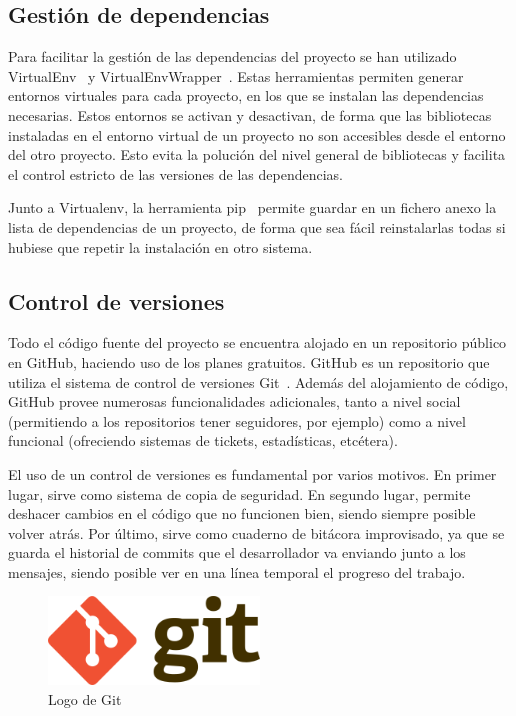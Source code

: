 \subsection{Gestión de dependencias}

Para facilitar la gestión de las dependencias del proyecto se han utilizado VirtualEnv~\cite{virtualenv}
y VirtualEnvWrapper~\cite{virtualenvwrapper}. Estas herramientas permiten generar
entornos virtuales para cada proyecto, en los que se instalan las dependencias necesarias.
Estos entornos se activan y desactivan, de forma que las bibliotecas instaladas en
el entorno virtual de un proyecto no son accesibles desde el entorno del
otro proyecto. Esto evita la polución del nivel general de bibliotecas y facilita el
control estricto de las versiones de las dependencias.

Junto a Virtualenv, la herramienta pip~\cite{pip} permite guardar en un fichero anexo
la lista de dependencias de un proyecto, de forma que sea fácil reinstalarlas todas
si hubiese que repetir la instalación en otro sistema.

\subsection{Control de versiones}

Todo el código fuente del proyecto se encuentra alojado en un repositorio público
en GitHub, haciendo uso de los planes gratuitos. GitHub es un repositorio que
utiliza el sistema de control de versiones Git~\cite{git}. Además del alojamiento de
código, GitHub provee numerosas funcionalidades adicionales, tanto a nivel
social (permitiendo a los repositorios tener seguidores, por ejemplo) como a nivel funcional
(ofreciendo sistemas de tickets, estadísticas, etcétera).

El uso de un control de versiones es fundamental por varios motivos. En primer
lugar, sirve como sistema de copia de seguridad. En segundo lugar, permite deshacer
cambios en el código que no funcionen bien, siendo siempre posible volver
atrás. Por último, sirve como cuaderno de bitácora improvisado, ya que se guarda
el historial de commits que el desarrollador va enviando junto a los mensajes,
siendo posible ver en una línea temporal el progreso del trabajo.

\begin{figure}[htbp]
    \centering
    \includegraphics[width=0.5\textwidth]{6_implementacion/git_logo}
    \caption{Logo de Git}
    \label{fig:git-logo}
\end{figure}

